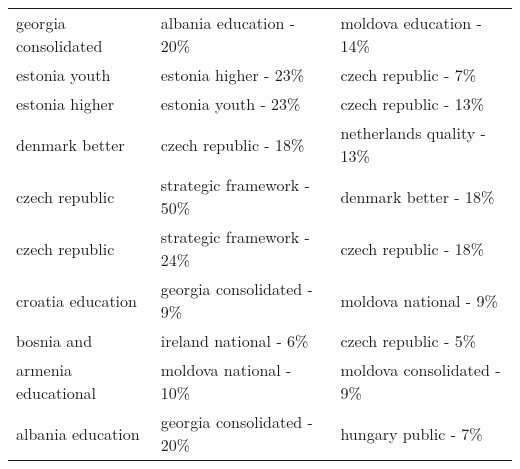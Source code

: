 \begin{tabular}{lll}
 georgia consolidated               & albania education - 20\%                  & moldova education - 14\%    \\
 estonia youth                      & estonia higher - 23\%                     & czech republic - 7\%        \\
 estonia higher                     & estonia youth - 23\%                      & czech republic - 13\%       \\
 denmark better                     & czech republic - 18\%                     & netherlands quality - 13\%  \\
 czech republic                     & strategic framework - 50\%                & denmark better - 18\%       \\
 czech republic                     & strategic framework - 24\%                & czech republic - 18\%       \\
 croatia education                  & georgia consolidated - 9\%                & moldova national - 9\%      \\
 bosnia and                         & ireland national - 6\%                    & czech republic - 5\%        \\
 armenia educational                & moldova national - 10\%                   & moldova consolidated - 9\%  \\
 albania education                  & georgia consolidated - 20\%               & hungary public - 7\%        \\
\hline
\end{tabular}